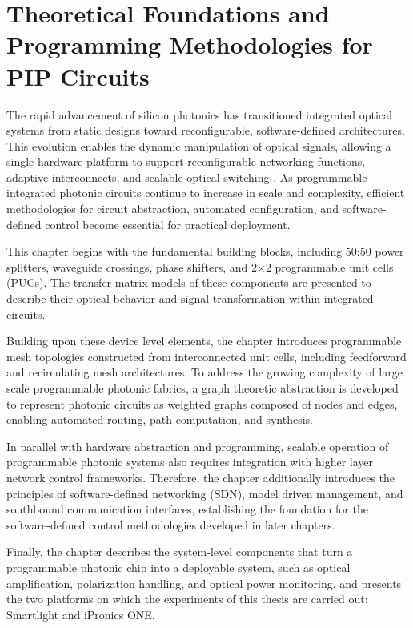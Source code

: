 
\chapter{Theoretical Foundations and Programming Methodologies for PIP Circuits} \label{chap:fundamentals}
The rapid advancement of silicon photonics has transitioned integrated optical systems from static designs toward reconfigurable, software-defined architectures.
This evolution enables the dynamic manipulation of optical signals, allowing a single hardware platform to support reconfigurable networking functions, adaptive interconnects, and scalable optical switching \cite{bogaerts2020programmable}.
As programmable integrated photonic circuits continue to increase in scale and complexity, efficient methodologies for circuit abstraction, automated configuration, and software-defined control become essential for practical deployment.

This chapter begins with the fundamental building blocks, including 50:50 power splitters, waveguide crossings, phase shifters, and 2$\times$2 programmable unit cells (PUCs).
The transfer-matrix models of these components are presented to describe their optical behavior and signal transformation within integrated circuits.

Building upon these device level elements, the chapter introduces programmable mesh topologies constructed from interconnected unit cells, including feedforward and recirculating mesh architectures.
To address the growing complexity of large scale programmable photonic fabrics, a graph theoretic abstraction is developed to represent photonic circuits as weighted graphs composed of nodes and edges, enabling automated routing, path computation, and synthesis.

In parallel with hardware abstraction and programming, scalable operation of programmable photonic systems also requires integration with higher layer network control frameworks.
Therefore, the chapter additionally introduces the principles of software-defined networking (SDN), model driven management, and southbound communication interfaces, establishing the foundation for the software-defined control methodologies developed in later chapters.

Finally, the chapter describes the system-level components that turn a programmable photonic chip into a deployable system, such as optical amplification, polarization handling, and optical power monitoring, and presents the two platforms on which the experiments of this thesis are carried out: Smartlight and iPronics ONE.

